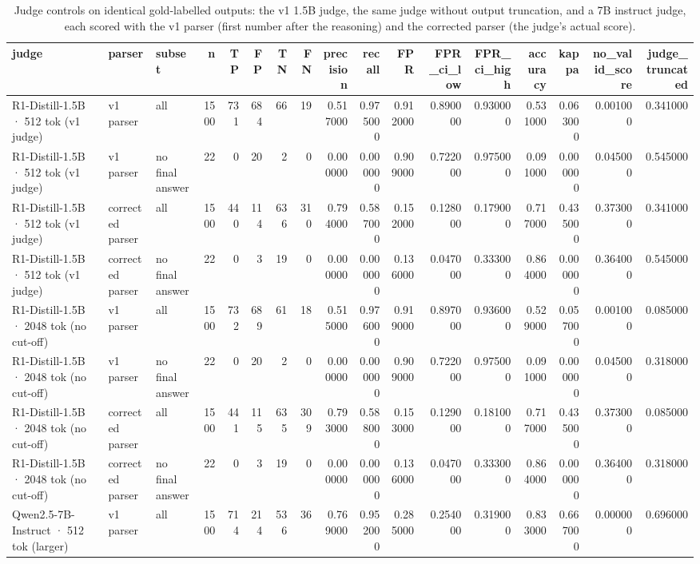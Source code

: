 \begin{table}
\caption{Judge controls on identical gold-labelled outputs: the v1 1.5B judge, the same judge without output truncation, and a 7B instruct judge, each scored with the v1 parser (first number after the reasoning) and the corrected parser (the judge's actual score).}
\label{tab:judge_controls}
\begin{tabular}{lllrrrrrrrrrrrrrr}
\toprule
judge & parser & subset & n & TP & FP & TN & FN & precision & recall & FPR & FPR_ci_low & FPR_ci_high & accuracy & kappa & no_valid_score & judge_truncated \\
\midrule
R1-Distill-1.5B · 512 tok (v1 judge) & v1 parser & all & 1500 & 731 & 684 & 66 & 19 & 0.517000 & 0.975000 & 0.912000 & 0.890000 & 0.930000 & 0.531000 & 0.063000 & 0.001000 & 0.341000 \\
R1-Distill-1.5B · 512 tok (v1 judge) & v1 parser & no final answer & 22 & 0 & 20 & 2 & 0 & 0.000000 & 0.000000 & 0.909000 & 0.722000 & 0.975000 & 0.091000 & 0.000000 & 0.045000 & 0.545000 \\
R1-Distill-1.5B · 512 tok (v1 judge) & corrected parser & all & 1500 & 440 & 114 & 636 & 310 & 0.794000 & 0.587000 & 0.152000 & 0.128000 & 0.179000 & 0.717000 & 0.435000 & 0.373000 & 0.341000 \\
R1-Distill-1.5B · 512 tok (v1 judge) & corrected parser & no final answer & 22 & 0 & 3 & 19 & 0 & 0.000000 & 0.000000 & 0.136000 & 0.047000 & 0.333000 & 0.864000 & 0.000000 & 0.364000 & 0.545000 \\
R1-Distill-1.5B · 2048 tok (no cut-off) & v1 parser & all & 1500 & 732 & 689 & 61 & 18 & 0.515000 & 0.976000 & 0.919000 & 0.897000 & 0.936000 & 0.529000 & 0.057000 & 0.001000 & 0.085000 \\
R1-Distill-1.5B · 2048 tok (no cut-off) & v1 parser & no final answer & 22 & 0 & 20 & 2 & 0 & 0.000000 & 0.000000 & 0.909000 & 0.722000 & 0.975000 & 0.091000 & 0.000000 & 0.045000 & 0.318000 \\
R1-Distill-1.5B · 2048 tok (no cut-off) & corrected parser & all & 1500 & 441 & 115 & 635 & 309 & 0.793000 & 0.588000 & 0.153000 & 0.129000 & 0.181000 & 0.717000 & 0.435000 & 0.373000 & 0.085000 \\
R1-Distill-1.5B · 2048 tok (no cut-off) & corrected parser & no final answer & 22 & 0 & 3 & 19 & 0 & 0.000000 & 0.000000 & 0.136000 & 0.047000 & 0.333000 & 0.864000 & 0.000000 & 0.364000 & 0.318000 \\
Qwen2.5-7B-Instruct · 512 tok (larger) & v1 parser & all & 1500 & 714 & 214 & 536 & 36 & 0.769000 & 0.952000 & 0.285000 & 0.254000 & 0.319000 & 0.833000 & 0.667000 & 0.000000 & 0.696000 \\

\end{tabular}
\end{table}
